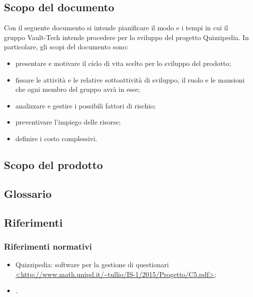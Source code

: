 \documentclass[a4paper, titlepage]{article}
\begin{document}
	\subsection{Scopo del documento}
	Con il seguente documento si intende pianificare il modo e i tempi in cui il gruppo Vault-Tech intende procedere per lo sviluppo del progetto Quizzipedia.
	In particolare, gli scopi del documento sono:
	\begin{itemize}
		\item presentare e motivare il ciclo di vita scelto per lo sviluppo del prodotto;
		\item fissare le attività e le relative sottoattività di sviluppo, il ruolo e le mansioni che ogni membro del gruppo avrà in esse;
		\item analizzare e gestire i possibili fattori di rischio;
		\item preventivare l'impiego delle risorse;
		\item definire i costo complessivi.
	\end{itemize}
	
	
	\subsection{Scopo del prodotto}
	\SCOPO
	
	\subsection{Glossario}
	\GLOSSARIO
	\subsection{Riferimenti}
	\subsubsection{Riferimenti normativi}
	\begin{itemize}
		\item {} Quizzipedia: software per la gestione di questionari \url{<http://www.math.unipd.it/~tullio/IS-1/2015/Progetto/C5.pdf>};
		\item {} .
	\end{itemize}
	
\end{document}
